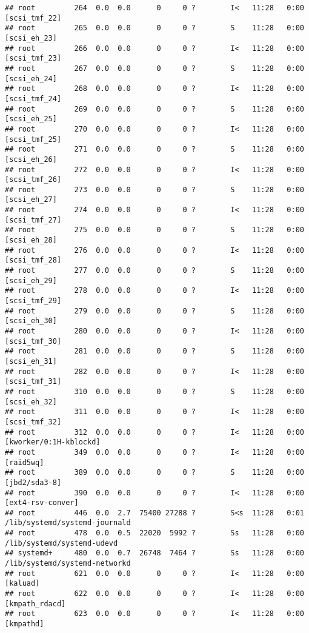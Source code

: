 \documentclass[]{article}
\begin{document}
\begin{verbatim}
## root         264  0.0  0.0      0     0 ?        I<   11:28   0:00 [scsi_tmf_22]
## root         265  0.0  0.0      0     0 ?        S    11:28   0:00 [scsi_eh_23]
## root         266  0.0  0.0      0     0 ?        I<   11:28   0:00 [scsi_tmf_23]
## root         267  0.0  0.0      0     0 ?        S    11:28   0:00 [scsi_eh_24]
## root         268  0.0  0.0      0     0 ?        I<   11:28   0:00 [scsi_tmf_24]
## root         269  0.0  0.0      0     0 ?        S    11:28   0:00 [scsi_eh_25]
## root         270  0.0  0.0      0     0 ?        I<   11:28   0:00 [scsi_tmf_25]
## root         271  0.0  0.0      0     0 ?        S    11:28   0:00 [scsi_eh_26]
## root         272  0.0  0.0      0     0 ?        I<   11:28   0:00 [scsi_tmf_26]
## root         273  0.0  0.0      0     0 ?        S    11:28   0:00 [scsi_eh_27]
## root         274  0.0  0.0      0     0 ?        I<   11:28   0:00 [scsi_tmf_27]
## root         275  0.0  0.0      0     0 ?        S    11:28   0:00 [scsi_eh_28]
## root         276  0.0  0.0      0     0 ?        I<   11:28   0:00 [scsi_tmf_28]
## root         277  0.0  0.0      0     0 ?        S    11:28   0:00 [scsi_eh_29]
## root         278  0.0  0.0      0     0 ?        I<   11:28   0:00 [scsi_tmf_29]
## root         279  0.0  0.0      0     0 ?        S    11:28   0:00 [scsi_eh_30]
## root         280  0.0  0.0      0     0 ?        I<   11:28   0:00 [scsi_tmf_30]
## root         281  0.0  0.0      0     0 ?        S    11:28   0:00 [scsi_eh_31]
## root         282  0.0  0.0      0     0 ?        I<   11:28   0:00 [scsi_tmf_31]
## root         310  0.0  0.0      0     0 ?        S    11:28   0:00 [scsi_eh_32]
## root         311  0.0  0.0      0     0 ?        I<   11:28   0:00 [scsi_tmf_32]
## root         312  0.0  0.0      0     0 ?        I<   11:28   0:00 [kworker/0:1H-kblockd]
## root         349  0.0  0.0      0     0 ?        I<   11:28   0:00 [raid5wq]
## root         389  0.0  0.0      0     0 ?        S    11:28   0:00 [jbd2/sda3-8]
## root         390  0.0  0.0      0     0 ?        I<   11:28   0:00 [ext4-rsv-conver]
## root         446  0.0  2.7  75400 27288 ?        S<s  11:28   0:01 /lib/systemd/systemd-journald
## root         478  0.0  0.5  22020  5992 ?        Ss   11:28   0:00 /lib/systemd/systemd-udevd
## systemd+     480  0.0  0.7  26748  7464 ?        Ss   11:28   0:00 /lib/systemd/systemd-networkd
## root         621  0.0  0.0      0     0 ?        I<   11:28   0:00 [kaluad]
## root         622  0.0  0.0      0     0 ?        I<   11:28   0:00 [kmpath_rdacd]
## root         623  0.0  0.0      0     0 ?        I<   11:28   0:00 [kmpathd]

\end{verbatim}
\end{document}
